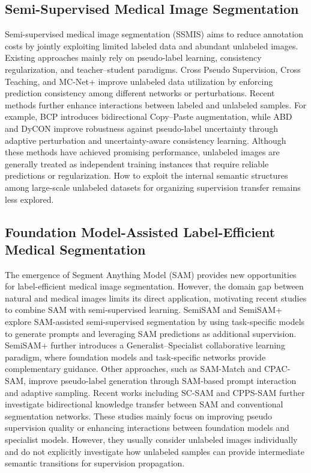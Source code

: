 \documentclass[a4paper,fleqn]{cas-dc}
\begin{document}
\subsection{Semi-Supervised Medical Image Segmentation}

Semi-supervised medical image segmentation (SSMIS) aims to reduce annotation costs by jointly exploiting limited labeled data and abundant unlabeled images. Existing approaches mainly rely on pseudo-label learning, consistency regularization, and teacher--student paradigms. Cross Pseudo Supervision, Cross Teaching, and MC-Net+ improve unlabeled data utilization by enforcing prediction consistency among different networks or perturbations. Recent methods further enhance interactions between labeled and unlabeled samples. For example, BCP introduces bidirectional Copy--Paste augmentation, while ABD and DyCON improve robustness against pseudo-label uncertainty through adaptive perturbation and uncertainty-aware consistency learning.
Although these methods have achieved promising performance, unlabeled images are generally treated as independent training instances that require reliable predictions or regularization. How to exploit the internal semantic structures among large-scale unlabeled datasets for organizing supervision transfer remains less explored.


\subsection{Foundation Model-Assisted Label-Efficient Medical Segmentation}

The emergence of Segment Anything Model (SAM) provides new opportunities for label-efficient medical image segmentation. However, the domain gap between natural and medical images limits its direct application, motivating recent studies to combine SAM with semi-supervised learning.
SemiSAM and SemiSAM+ explore SAM-assisted semi-supervised segmentation by using task-specific models to generate prompts and leveraging SAM predictions as additional supervision. SemiSAM+ further introduces a Generalist--Specialist collaborative learning paradigm, where foundation models and task-specific networks provide complementary guidance. Other approaches, such as SAM-Match and CPAC-SAM, improve pseudo-label generation through SAM-based prompt interaction and adaptive sampling. Recent works including SC-SAM and CPPS-SAM further investigate bidirectional knowledge transfer between SAM and conventional segmentation networks.
These studies mainly focus on improving pseudo supervision quality or enhancing interactions between foundation models and specialist models. However, they usually consider unlabeled images individually and do not explicitly investigate how unlabeled samples can provide intermediate semantic transitions for supervision propagation.
\end{document}
